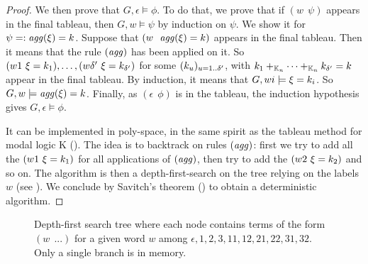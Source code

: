 \begin{proof}
    We then prove that $G, \epsilon \models \phi$. To do that, we prove that if $(w~~\psi)$ appears in the final tableau, then $G, w \models \psi$ by induction on $\psi$.
    We show it for $\psi =: \mathit{agg}(\xi) = k$.
    Suppose that $(w~~\mathit{agg}(\xi) = k)$ appears in the final tableau. Then it means that the rule $(\mathit{agg})$ has been applied on it. So $(w1~\xi = k_{1}), \dotsc, (w \delta'~\xi = k_{{\delta'}})$ for some $(k_u)_{u=1..\delta'}$, with $k_{1} +_{\mathbb K_n} 
 \dotsb +_{\mathbb K_n} k_{\delta'} = k$ appear in the final tableau. By induction, it means that $G, wi \models \xi = k_{i}$. So $G, w \models \mathit{agg}(\xi) = k$.
Finally, as $(\epsilon~~\phi)$ is in the tableau, the induction hypothesis gives $G, \epsilon \models \phi$.


It can be implemented in poly-space, in the same spirit as the tableau method for modal logic K (\cite{DBLP:journals/ai/HalpernM92}). The idea is to backtrack on rules $(\mathit{agg})$: first we try to add all the $(w1~\xi = k_{1})$ for all applications of $(\mathit{agg})$, then try to add the $(w2~\xi = k_{2})$ and so on. The algorithm is then a depth-first-search on the tree relying on the labels $w$ (see ). We conclude by Savitch's theorem (\cite{DBLP:journals/jcss/Savitch70}) to obtain a deterministic algorithm.
\end{proof}



\begin{figure}
	\centering
		\small
	\caption{Depth-first search tree where each node contains terms of the form $(w~~...)$ for a given word $w$ among $\epsilon, 1, 2, 3, 11, 12, 21, 22, 31, 32$. Only a single branch is in memory.
 }
  \label{figure:searchtree}
 
\end{figure}





